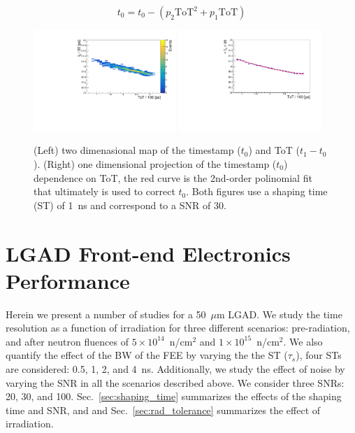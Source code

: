 \documentclass[preprint,1p]{elsarticle}
\begin{document}
\begin{equation}\label{eq:time_walk}
  t_{0} = t_{0}-(p_{2}\mathrm{ToT}^2+p_{1}\mathrm{ToT})
\end{equation}

\begin{figure}[htbp]
  \centering
  \includegraphics[width=0.48\textwidth]{figs/twoD_ToT_pre_rad_st_1ns_snr_30_le_tot_threshold_30mV_v2.pdf} \hfill
  \includegraphics[width=0.48\textwidth]{figs/oneD_ToT_pre_rad_st_1ns_snr_30_le_tot_threshold_30mV_v2.pdf}
  \caption{(Left) two dimenasional map of the timestamp ($t_{0}$) and ToT ($t_{1} - t_{0}$).
  (Right) one dimensional projection of the timestamp ($t_{0}$) dependence on ToT, the red curve is the 2nd-order polinomial fit that
  ultimately is used to correct $t_{0}$. Both figures use a shaping time (ST) of 1~\si{ns} and correspond to a SNR of 30.}
  \label{fig:ToT}
\end{figure}




\section{LGAD Front-end Electronics Performance}\label{sec:results}

Herein we present a number of studies for a 50~$\mu$m LGAD. We study the time resolution as a function of irradiation
for three different scenarios: pre-radiation, and after neutron fluences of
 $5\times 10^{14}$~n/cm$^2$ and $1\times 10^{15}$~n/cm$^2$. We also quantify the effect of the BW of the FEE by varying the
 the ST ($\tau_{s}$), four STs are considered: 0.5, 1, 2, and 4~\si{ns}. Additionally, we study the effect of noise by varying
 the SNR in all the scenarios described above. We consider three SNRs: 20, 30, and 100.
 Sec.~\ref{sec:shaping_time} summarizes the effects of the shaping time and SNR, and
and Sec.~\ref{sec:rad_tolerance} summarizes the effect of irradiation.
\end{document}
